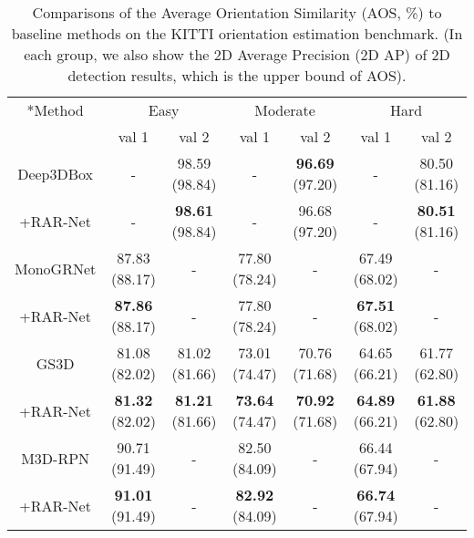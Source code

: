 \documentclass[runningheads]{llncs}
\begin{document}
\begin{table}[t]
\caption{Comparisons of the Average Orientation Similarity (AOS, \%) to baseline methods on the KITTI orientation estimation benchmark. (In each group, we also show the 2D Average Precision (2D AP) of 2D detection results, which is the upper bound of AOS).}
\begin{center}
\scalebox{0.82}
{
\begin{tabular}{|c|c|c|c|c|c|c|}
\hline
\small \multirow{2}*{Method} &  \multicolumn{2}{c|}{Easy} & \multicolumn{2}{c|}{Moderate} & \multicolumn{2}{c|}{Hard}\\
\cline{2-7}
~ &  val 1 & val 2 & val 1 & val 2  &val 1 & val 2   \\
\hline\hline
Deep3DBox \cite{mousavian20173d} &- &98.59 (98.84)& - & \textbf{96.69} (97.20) & -  & 80.50 (81.16)\\
+RAR-Net &- & \textbf{98.61}  (98.84)&- &96.68 (97.20) & -& \textbf{80.51}  (81.16) \\
\hline
MonoGRNet \cite{qin2019monogrnet} &87.83 (88.17) &-& 77.80 (78.24)& -& 67.49 (68.02) & -\\
+RAR-Net& \textbf{87.86} (88.17) & - & 77.80  (78.24)& -&\textbf{67.51} (68.02)&-   \\
\hline
 GS3D \cite{li2019gs3d} &81.08 (82.02)&81.02 (81.66)& 73.01 (74.47) & 70.76 (71.68) & 64.65 (66.21)  & 61.77 (62.80)\\
+RAR-Net&\textbf{81.32} (82.02)& \textbf{81.21} (81.66)&\textbf{73.64} (74.47)&\textbf{70.92} (71.68)& \textbf{64.89} (66.21)&\textbf{61.88} (62.80)\\
\hline
M3D-RPN \cite{brazil2019m3d} &90.71 (91.49) &- &82.50 (84.09)& - & 66.44 (67.94) & -\\
+RAR-Net&\textbf{91.01} (91.49)& -&\textbf{82.92} (84.09)&- & \textbf{66.74} (67.94)&- \\
\hline
\end{tabular}
}
\end{center}
\label{tab:orientation}
\end{table}
\end{document}
